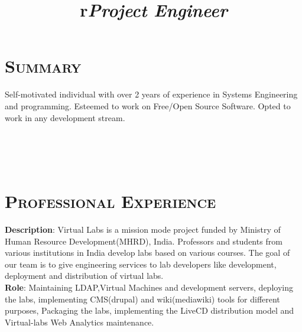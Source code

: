 \begin{resume}




\section{\textsc{Summary}}
Self-motivated individual with over 2 years of experience in Systems
Engineering and programming. Esteemed to work on Free/Open Source
Software. Opted to work in any development stream.  \\
 

\begin{formatb}
  \title{r}\\
  \\
  \body\\
\end{formatb}

\section{\textsc{Professional Experience}}
\title{\em \textbf{Project Engineer}}
\begin{position}
\textbf{Description}: Virtual Labs is a mission mode project funded by
Ministry of Human Resource Development(MHRD), India. Professors and
students from various institutions in India develop labs based on
various courses. The goal of our team is to give engineering services
to lab developers like development, deployment and distribution of
virtual labs.\\

\textbf{Role}: Maintaining LDAP,Virtual Machines and development
servers, deploying the labs, implementing CMS(drupal) and
wiki(mediawiki) tools for different purposes, Packaging the labs,
implementing the LiveCD distribution model and Virtual-labs Web
Analytics maintenance.\\


\end{position}
\end{resume}
